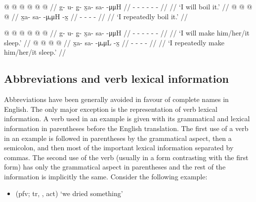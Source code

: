 \documentclass[12pt,letterpaper,oneside,article]{memoir}
\begin{document}
\begin{multicols}{2}
\pex\label{ex:intro-root-ta}%
\a\label{ex:intro-root-ta-uuH}%
\begingl
	\gla	{} @ {} @ {} @ {} @ {} @ {} @ {} //
	\glb	g- u- g̱- x̱a- sa-  -μμH //
	\glc	{}- - - - -  - //
	\gld	{} {} {} {} {} {} {} //
	\glft	‘I will boil it.’
		//
\endgl
\a\label{ex:intro-root-ta-ueuH}%
\begingl
	\gla	{} @ {} @ {} @ {} @ {} //
	\glb	x̱a- sa-  -μₑμH -x̱ //
	\glc	{}- -  - - //
	\gld	{} {} {} {} {} //
	\glft	‘I repeatedly boil it.’
		//
\endgl
\xe

\pex\label{ex:intro-root-taL}%
\a\label{ex:intro-root-taL-uuH}%
\begingl
	\gla	{} @ {} @ {} @ {} @ {} @ {} @ {} //
	\glb	g- u- g̱- x̱a- sa-  -μμH //
	\glc	{}- - - - -  - //
	\gld	{} {} {} {} {} {} {} //
	\glft	‘I will make him/her/it sleep.’
		//
\endgl
\a\label{ex:intro-root-taL-ueuL}%
\begingl
	\gla	{} @ {} @ {} @ {} @ {} //
	\glb	x̱a- sa-  -μₑμL -x̱ //
	\glc	{}- -  - - //
	\gld	{} {} {} {} {} //
	\glft	‘I repeatedly make him/her/it sleep.’
		//
\endgl
\xe
\end{multicols}

\subsection{Abbreviations and verb lexical information}\label{sec:intro-abbrev}

Abbreviations have been generally avoided in favour of complete names in English.
The only major exception is the representation of verb lexical information.
A verb used in an example is given with its grammatical and lexical information in parentheses before the English translation.
The first use of a verb in an example is followed in parentheses by the grammatical aspect, then a semicolon, and then most of the important lexical information separated by commas. The second use of the verb (usually in a form contrasting with the first form) has only the grammatical aspect in parentheses and the rest of the information is implicitly the same.
Consider the following example:

\begin{itemize}
\item	{} (pfv; tr, ,  act) ‘we dried something’
\end{itemize}
\end{document}
